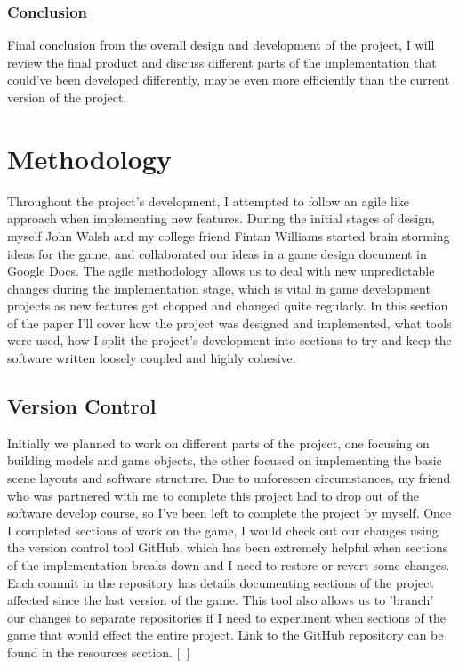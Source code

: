 \subsection{Conclusion}
Final conclusion from the overall design and development of the project, I will review the final product and discuss different parts of the implementation that could've been developed differently, maybe even more efficiently than the current version of the project.
\chapter{Methodology}
Throughout the project's development, I attempted to follow an agile like approach when implementing new features. During the initial stages of design, myself John Walsh and my college friend Fintan Williams started brain storming ideas for the game, and collaborated our ideas in a game design document in Google Docs. The agile methodology allows us to deal with new unpredictable changes during the implementation stage, which is vital in game development projects as new features get chopped and changed quite regularly. In this section of the paper I'll cover how the project was designed and implemented, what tools were used, how I split the project's development into sections to try and keep the software written loosely coupled and highly cohesive.
\section{Version Control}
Initially we planned to work on different parts of the project, one focusing on building models and game objects, the other focused on implementing the basic scene layouts and software structure. Due to unforeseen circumstances, my friend who was partnered with me to complete this project had to drop out of the software develop course, so I've been left to complete the project by myself. Once I completed sections of work on the game, I would check out our changes using the version control tool GitHub, which has been extremely helpful when sections of the implementation breaks down and I need to restore or revert some changes. Each commit in the repository has details documenting sections of the project affected since the last version of the game. This tool also allows us to 'branch' our changes to separate repositories if I need to experiment when sections of the game that would effect the entire project. Link to the GitHub repository can be found in the resources section. [~\cite{GitHub}]
